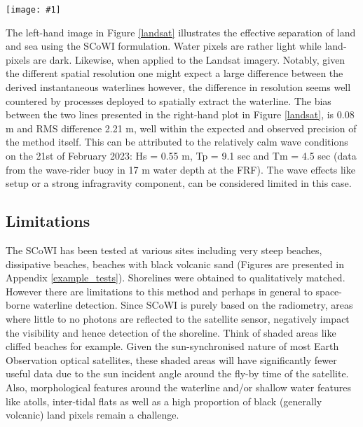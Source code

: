 \documentclass[remotesensing,technicalnote,submit,pdftex,moreauthors]{Definitions/mdpi}
\newcommand{\myfigure}[4]{
    \begin{figure*}[ht!]
        \centering
        \texttt{[image: \#1]}	 
        \caption{\itshape#2}
        \label{#3}
    \end{figure*} 
}
\begin{document}
\myfigure{img/duck_comparison_20230221_2.png}{SCoWI applied to Sentinel-2 and LandSat satellite optical imagery at Duck (USA). The left-hand image shows the SCoWI applied to a Sentinel-2 image (21 February 2023 at 15h50 GMT) and the middle image to Landsat-8 image (21 February 2023 at 15h41 GMT). The grey-scale limits are set between 2\% to 98\% of all pixel values for both images. The coloured lines represent the detected instantaneous waterline, which are then both superimposed onto a Sentinel-2 colour image on the right-hand side.}{landsat}{1}

The left-hand image in Figure \ref{landsat} illustrates the effective separation of land and sea using the SCoWI formulation. Water pixels are rather light while land-pixels are dark. Likewise, when applied to the Landsat imagery. Notably, given the different spatial resolution one might expect a large difference between the derived instantaneous waterlines however, the difference in resolution seems well countered by processes deployed to spatially extract the waterline.  The bias between the two lines presented in the right-hand plot in Figure \ref{landsat}, is 0.08 m and RMS difference 2.21 m, well within the expected and observed precision of the method itself. This can be attributed to the relatively calm wave conditions on the 21st of February 2023: Hs = 0.55 m, Tp = 9.1 sec and Tm = 4.5 sec (data from the wave-rider buoy in 17 m water depth at the FRF). The wave effects like setup or a strong infragravity component, can be considered limited in this case. 

\subsection{Limitations}
The SCoWI has been tested at various sites including very steep beaches, dissipative beaches, beaches with black volcanic sand (Figures are presented in Appendix \ref{example_tests}). Shorelines were obtained to qualitatively matched. However there are limitations to this method and perhaps in general to space-borne waterline detection. Since SCoWI is purely based on the radiometry, areas where little to no photons are reflected to the satellite sensor, negatively impact the visibility and hence detection of the shoreline. Think of shaded areas like cliffed beaches for example. Given the sun-synchronised nature of most Earth Observation optical satellites, these shaded areas will have significantly fewer useful data due to the sun incident angle around the fly-by time of the satellite. Also, morphological features around the waterline and/or shallow water features like atolls, inter-tidal flats as well as a high proportion of black (generally volcanic) land pixels remain a challenge.
\end{document}
